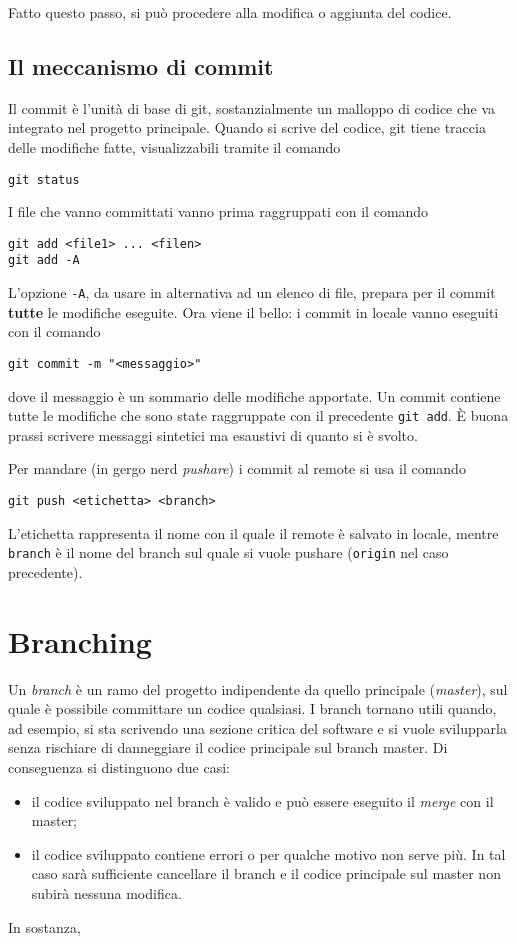 \documentclass[a4paper, 11pt]{article}
\begin{document}
	Fatto questo passo, si può procedere alla modifica o aggiunta del codice.
	
	\subsection{Il meccanismo di commit}
	Il commit è l'unità di base di git, sostanzialmente un malloppo di codice che va integrato nel progetto principale. Quando si scrive del codice, git tiene traccia delle modifiche fatte, visualizzabili tramite il comando \begin{lstlisting}
git status
	\end{lstlisting}
	I file che vanno committati vanno prima raggruppati con il comando \begin{lstlisting}
git add <file1> ... <filen>
git add -A
	\end{lstlisting}
	
	L'opzione \lstinline|-A|, da usare in alternativa ad un elenco di file, prepara per il commit \textbf{tutte} le modifiche eseguite.
	Ora viene il bello: i commit in locale vanno eseguiti con il comando \begin{lstlisting}
git commit -m "<messaggio>"
	\end{lstlisting}
	dove il messaggio è un sommario delle modifiche apportate. Un commit contiene tutte le modifiche che sono state raggruppate con il precedente \lstinline|git add|. È buona prassi scrivere messaggi sintetici ma esaustivi di quanto si è svolto.
	
	Per mandare (in gergo nerd \emph{pushare}) i commit al remote si usa il comando \begin{lstlisting}
git push <etichetta> <branch>
	\end{lstlisting}
	L'etichetta rappresenta il nome con il quale il remote è salvato in locale, mentre \lstinline|branch| è il nome del branch sul quale si vuole pushare (\lstinline|origin| nel caso precedente).
	
	\section{Branching}
	Un \emph{branch} è un ramo del progetto indipendente da quello principale (\emph{master}), sul quale è possibile committare un codice qualsiasi. I branch tornano utili quando, ad esempio, si sta scrivendo una sezione critica del software e si vuole svilupparla senza rischiare di danneggiare il codice principale sul branch master. Di conseguenza si distinguono due casi:
	\begin{itemize}
		\item il codice sviluppato nel branch è valido e può essere eseguito il \emph{merge} con il master;
		\item il codice sviluppato contiene errori o per qualche motivo non serve più. In tal caso sarà sufficiente cancellare il branch e il codice principale sul master non subirà nessuna modifica.
	\end{itemize}
	In sostanza, 
	
	
	
	
	
	
	
	
	
	
	
	
	
	
	
	
\end{document}
